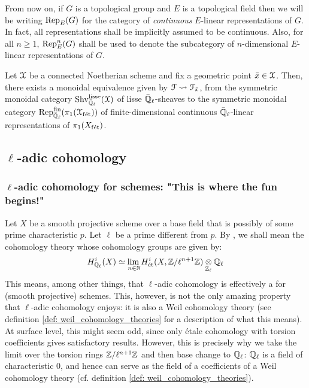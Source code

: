                 \begin{convention} \label{conv: continuous_linear_representations}
                    From now on, if $G$ is a topological group and $E$ is a topological field then we will be writing $\mathrm{Rep}_E(G)$ for the category of \textit{continuous} $E$-linear representations of $G$. In fact, all representations shall be implicitly assumed to be continuous. Also, for all $n \geq 1$, $\mathrm{Rep}_E^n(G)$ shall be used to denote the subcategory of $n$-dimensional $E$-linear representations of $G$.
                \end{convention}
                \begin{theorem} \label{theorem: galois_representations_are_lisse_sheaves}
                    \cite[Theorem 1.4.5.7]{conrad_etale_cohomology} Let $\mathcal{X}$ be a connected Noetherian scheme and fix a geometric point $\bar{x} \in \mathcal{X}$. Then, there exists a monoidal equivalence given by $\mathcal{F} \leadsto \mathcal{F}_{\bar{x}}$, from the symmetric monoidal category $\mathrm{Shv}_{\bar{\mathbb{Q}}_{\ell}}^{\mathrm{lisse}}(\mathcal{X})$ of lisse $\bar{\mathbb{Q}}_{\ell}$-sheaves to the symmetric monoidal category $\mathrm{Rep}_{\bar{\mathbb{Q}}_{\ell}}^{\mathrm{fin}}(\pi_1(\mathcal{X}_{\mathrm{f\acute{e}t}}))$ of finite-dimensional continuous $\bar{\mathbb{Q}}_{\ell}$-linear representations of $\pi_1(X_{\mathrm{f\acute{e}t}})$.
                \end{theorem}
    
        \subsection{\texorpdfstring{$\ell$}{}-adic cohomology}
            \subsubsection{\texorpdfstring{$\ell$}{}-adic cohomology for schemes: "This is where the fun begins!"}
                Let $X$ be a smooth projective scheme over a base field that is possibly of some prime characteristic $p$. Let $\ell$ be a prime different from $p$. By , we shall mean the cohomology theory whose cohomology groups are given by:
                    $$H^i_{\Q_{\ell}}(X) \cong \underset{n \in \N}{\lim} H_{\et}^i(X, \Z/\ell^{n + 1}\Z) \tensor_{\Z_{\ell}} \Q_{\ell}$$
                This means, among other things, that $\ell$-adic cohomology is effectively a  for (smooth projective) schemes. This, however, is not the only amazing property that $\ell$-adic cohomology enjoys: it is also a Weil cohomology theory (see definition \ref{def: weil_cohomology_theories} for a description of what this means). At surface level, this might seem odd, since only \'etale cohomology with torsion coefficients gives satisfactory results. However, this is precisely why we take the limit over the torsion rings $\mathbb{Z}/\ell^{n + 1}\mathbb{Z}$ and then base change to $\mathbb{Q}_{\ell}$: $\mathbb{Q}_{\ell}$ is a field of characteristic $0$, and hence can serve as the field of a coefficients of a Weil cohomology theory (cf. definition \ref{def: weil_cohomology_theories}). 
                
